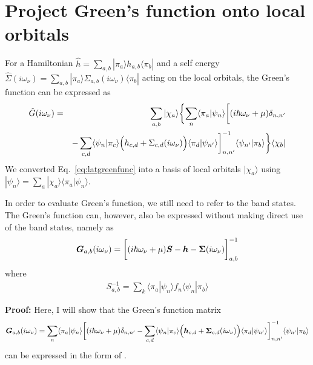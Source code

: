 \documentclass[11pt,a4paper]{report}
\begin{document}
\section{Project Green's function onto local orbitals}
For a Hamiltonian $\hat{h}=\sum_{a,b}|\pi_a\rangle
h_{a,b}\langle\pi_b|$ and a self energy 
$\hat{\Sigma}(i\omega_\nu)=
\sum_{a,b}|\pi_a\rangle
\Sigma_{a,b}(i\omega_\nu)
\langle\pi_b|$
acting on the local orbitals, the Green's function can be expressed
as
\begin{eqnarray}
\hat{G}(i\omega_\nu)&=&
\sum_{a,b}|\chi_a\rangle
\biggl\lbrace
\sum_n\langle\pi_a|\psi_n\rangle
\biggl[
(i\hbar\omega_\nu+\mu)\delta_{n,n'}
\nonumber\\
&&-\sum_{c,d}\langle\psi_n|\pi_c\rangle
\Bigl(h_{c,d}+\Sigma_{c,d}(i\omega_\nu)\Bigr)
\langle\pi_d|\psi_{n'}\rangle
\biggr]^{-1}_{n,n'}
\langle\psi_{n'}|\pi_b\rangle
\biggr\rbrace
\langle\chi_b|
\label{eq:greenlocorb}
\end{eqnarray}
We converted Eq.~\eqref{eq:latgreenfunc} into a basis of local
orbitals $|\chi_a\rangle$ using
$|\psi_n\rangle=\sum_a|\chi_a\rangle\langle\pi_a|\psi_n\rangle$.


In order to evaluate Green's function, we still need to refer to the
band states. The Green's function can, however, also be expressed
without making direct use of the band states, namely as
\begin{eqnarray}
\bm{G}_{a,b}(i\omega_\nu)
=\biggl[(i\hbar\omega_\nu+\mu)\bm{S}
-\bm{h}-\bm{\Sigma}(i\omega_\nu)\biggr]^{-1}
_{a,b}
\label{eq:greenlocform1}
\end{eqnarray}
where
\begin{eqnarray}
S^{-1}_{a,b}=\sum_k\langle\pi_a|\psi_n\rangle f_n\langle\psi_n|\pi_b\rangle
\label{eq:inverses}
\end{eqnarray}

\textbf{Proof:}
Here, I will show that the Green's function matrix 
\begin{eqnarray}
\bm{G}_{a,b}(i\omega_\nu)=
\sum_n\langle\pi_a|\psi_n\rangle
\biggl[
(i\hbar\omega_\nu+\mu)\delta_{n,n'}-
\sum_{c,d}\langle\psi_n|\pi_c\rangle
\Bigl(\bm{h}_{c,d}+\bm{\Sigma}_{c,d}(i\omega_\nu)\Bigr)
\langle\pi_d|\psi_{n'}\rangle
\biggr]^{-1}_{n,n'}
\langle\psi_{n'}|\pi_b\rangle
\nonumber\\
\label{eq:greenlocform2}
\end{eqnarray}
can be expressed in the form of .
\end{document}
